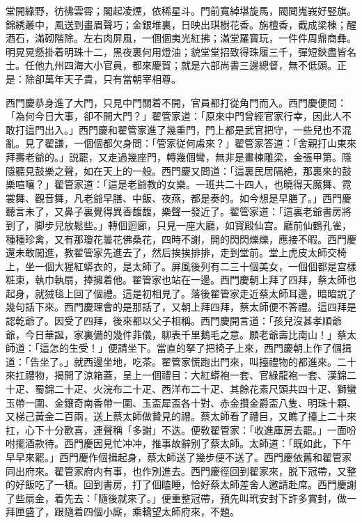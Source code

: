 \begin{myquote}
堂開綠野，彷彿雲霄；閣起凌煙，依稀星斗。門前寬綽堪旋馬，閥閲嵬峩好竪旗。錦綉叢中，風送到畫眉聲巧；金銀堆裏，日映出琪樹花香。旃檀香，截成梁棟；醒酒石，滿砌階除。左右肉屏風，一個個夷光紅拂；滿堂羅寳玩，一件件周鼎商彝。明晃晃懸掛着明珠十二，黑夜裏何用燈油；貌堂堂招致得珠履三千，彈短鋏盡皆名士。任他九州四海大小官員，都來慶賀；就是六部尚書三邊總督，無不低頭。正是：除卻萬年天子貴，只有當朝宰相尊。
\end{myquote}

西門慶恭身進了大門，只見中門關着不開，官員都打從角門而入。西門慶便問：「為何今日大事，卻不開大門？」翟管家道：「原來中門曾經官家行幸，因此人不敢打這門出入。」西門慶和翟管家進了幾重門，門上都是武官把守，一些兒也不混亂。見了翟謙，一個個都欠身問：「管家従何䖏來？」翟管家答道：「舍親打山東來拜壽老爺的。」説罷，又走過幾座門，轉幾個彎，無非是畫棟雕梁，金張甲第。隱隱聽見鼓樂之聲，如在天上的一般。西門慶又問道：「這裏民居隔絶，那裏來的鼓樂喧嚷？」翟管家道：「這是老爺教的女樂。一班共二十四人，也曉得天魔舞、霓裳舞、觀音舞，凡老爺早膳、中飯、夜燕，都是奏的。如今想是早膳了。」西門慶聽言未了，又鼻子裏覺得異香馥馥，樂聲一發近了。翟管家道：「這裏老爺書房將到了，脚步兒放鬆些。」轉個迴廊，只見一座大廳，如寳殿仙宫。廳前仙鶴孔雀，種種珍禽，又有那瓊花曇花佛桑花，四時不謝，開的閃閃爍爍，應接不暇。西門慶還未敢闖進，教翟管家先進去了，然后挨挨排排，走到堂前。堂上虎皮太師交椅上，坐一個大猩紅蟒衣的，是太師了。屏風後列有二三十個美女，一個個都是宫樣粧束，執巾執扇，捧擁着他。翟管家也站在一邊。西門慶朝上拜了四拜，蔡太師也起身，就狨毯上回了個禮。這是初相見了。落後翟管家走近蔡太師耳邊，暗暗説了幾句話下來。西門慶理會的是那話了，又朝上拜四拜，蔡太師便不答禮。這四拜是認乾爺了。因受了四拜，後來都以父子相稱。西門慶開言道：「孩兒沒甚孝順爺爺，今日華誕，家裏備的幾件菲儀，聊表千里鵝毛之意。願老爺壽比南山！」蔡太師道：「這怎的生受！」便請坐下。當直的拏了把椅子上來，西門慶朝上作了個揖道：「告坐了。」就西邊坐地，吃茶。翟管家慌跑出門來，叫擡禮物的都進來。二十來扛禮物，揭開了涼箱蓋，呈上一個禮目：大紅蟒袍一套、官綠龍袍一套、漢錦二十疋、蜀錦二十疋、火浣布二十疋、西洋布二十疋、其餘花素尺頭共四十疋、獅蠻玉帶一圍、金鑲奇南香帶一圍、玉盃犀盃各十對、赤金攢金爵盃八隻、明珠十顆、又梯己黃金二百兩，送上蔡太師做贄見的禮。蔡太師看了禮目，又瞧了擡上二十來扛，心下十分歡喜，連聲稱「多謝」不迭。便敎翟管家：「收進庫房去罷。」一面吩咐擺酒款待。西門慶因見忙冲冲，推事故辭别了蔡太師。太師道：「既如此，下午早早來罷。」西門慶作個揖起身，蔡太師送了幾步便不送了。西門慶依舊和翟管家同出府來。翟管家府内有事，也作別進去。西門慶徑回到翟家來，脱下冠帶，又整的好飯吃了一頓。回到書房，打了個瞌睡，恰好蔡太師差舍人邀請赴席。西門慶謝了些扇金，着先去：「隨後就來了。」便重整冠帶，預先叫玳安封下許多賞封，做一拜匣盛了，跟隨着四個小廝，乘轎望太師府來，不題。

